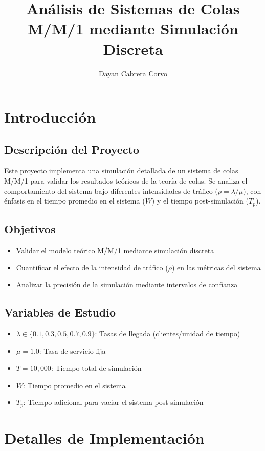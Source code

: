 \documentclass{article}
\title{Análisis de Sistemas de Colas M/M/1 mediante Simulación Discreta}
\author{Dayan Cabrera Corvo}
\begin{document}
	
	\maketitle
	
	\section{Introducción} \label{S1}
	\subsection{Descripción del Proyecto}
	Este proyecto implementa una simulación detallada de un sistema de colas M/M/1 para validar los resultados teóricos de la teoría de colas. Se analiza el comportamiento del sistema bajo diferentes intensidades de tráfico ($\rho = \lambda/\mu$), con énfasis en el tiempo promedio en el sistema ($W$) y el tiempo post-simulación ($T_p$).
	
	\subsection{Objetivos}
	\begin{itemize}
		\item Validar el modelo teórico M/M/1 mediante simulación discreta
		\item Cuantificar el efecto de la intensidad de tráfico ($\rho$) en las métricas del sistema
		\item Analizar la precisión de la simulación mediante intervalos de confianza
	\end{itemize}
	
	\subsection{Variables de Estudio}
	\begin{itemize}
		\item $\lambda \in \{0.1, 0.3, 0.5, 0.7, 0.9\}$: Tasas de llegada (clientes/unidad de tiempo)
		\item $\mu = 1.0$: Tasa de servicio fija
		\item $T = 10,000$: Tiempo total de simulación
		\item $W$: Tiempo promedio en el sistema
		\item $T_p$: Tiempo adicional para vaciar el sistema post-simulación
	\end{itemize}
	
	\section{Detalles de Implementación} \label{S2}
\end{document}
